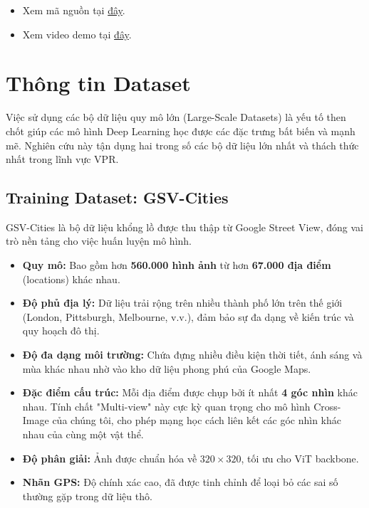 \documentclass[12pt,a4paper]{article}
\begin{document}
\begin{itemize}
    \item Xem mã nguồn tại \href{https://github.com/bin9638/-CS336.Q11.KHTN_Final}{đây}.
    \item Xem video demo tại \href{https://youtu.be/Vd4FCNJdR94}{đây}.
\end{itemize}

    \appendix
    \section{Thông tin Dataset}

    Việc sử dụng các bộ dữ liệu quy mô lớn (Large-Scale Datasets) là yếu tố then chốt giúp các mô hình Deep Learning học được các đặc trưng bất biến và mạnh mẽ. Nghiên cứu này tận dụng hai trong số các bộ dữ liệu lớn nhất và thách thức nhất trong lĩnh vực VPR.

    \subsection{Training Dataset: GSV-Cities}
    
    GSV-Cities là bộ dữ liệu khổng lồ được thu thập từ Google Street View, đóng vai trò nền tảng cho việc huấn luyện mô hình.
    
    \begin{itemize}
        \item \textbf{Quy mô:} Bao gồm hơn \textbf{560.000 hình ảnh} từ hơn \textbf{67.000 địa điểm} (locations) khác nhau.
        \item \textbf{Độ phủ địa lý:} Dữ liệu trải rộng trên nhiều thành phố lớn trên thế giới (London, Pittsburgh, Melbourne, v.v.), đảm bảo sự đa dạng về kiến trúc và quy hoạch đô thị.
        \item \textbf{Độ đa dạng môi trường:} Chứa đựng nhiều điều kiện thời tiết, ánh sáng và mùa khác nhau nhờ vào kho dữ liệu phong phú của Google Maps.
        \item \textbf{Đặc điểm cấu trúc:} Mỗi địa điểm được chụp bởi ít nhất \textbf{4 góc nhìn} khác nhau. Tính chất "Multi-view" này cực kỳ quan trọng cho mô hình Cross-Image của chúng tôi, cho phép mạng học cách liên kết các góc nhìn khác nhau của cùng một vật thể.
        \item \textbf{Độ phân giải:} Ảnh được chuẩn hóa về $320 \times 320$, tối ưu cho ViT backbone.
        \item \textbf{Nhãn GPS:} Độ chính xác cao, đã được tinh chỉnh để loại bỏ các sai số thường gặp trong dữ liệu thô.
    \end{itemize}
\end{document}
